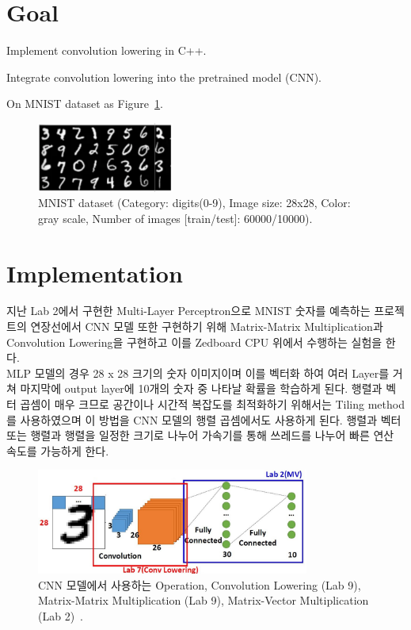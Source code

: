 \documentclass{article}
\begin{document}
\pagestyle{fancy}

\section*{Goal}

\begin{itemize*}
\item Implement convolution lowering in C++.
\item Integrate convolution lowering into the pretrained model (CNN).
\begin{itemize*}
\item On MNIST dataset as Figure~\ref{fig1}.
\end{itemize*}
\end{itemize*}
\begin{figure}[ht]
	\centering
	\includegraphics[width=0.4\textwidth]{fig/mnist.png}
\caption{MNIST dataset (Category: digits(0-9), Image size: 28x28, Color: gray scale, Number of images [train/test]: 60000/10000).}
\label{fig1}
\end{figure}

\section{Implementation}
지난 Lab 2에서 구현한 Multi-Layer Perceptron으로 MNIST 숫자를 예측하는 프로젝트의 연장선에서 CNN 모델 또한 구현하기 위해 Matrix-Matrix Multiplication과 Convolution Lowering을 구현하고 이를 Zedboard CPU 위에서 수행하는 실험을 한다. \\

MLP 모델의 경우 28 x 28 크기의 숫자 이미지이며 이를 벡터화 하여 여러 Layer를 거쳐 마지막에 output layer에 10개의 숫자 중 나타날 확률을 학습하게 된다. 행렬과 벡터 곱셈이 매우 크므로 공간이나 시간적 복잡도를 최적화하기 위해서는 Tiling method를 사용하였으며 이 방법을 CNN 모델의 행렬 곱셈에서도 사용하게 된다. 행렬과 벡터 또는 행렬과 행렬을 일정한 크기로 나누어 가속기를 통해 쓰레드를 나누어 빠른 연산 속도를 가능하게 한다. \\

\begin{figure}[htb!]
	\centering
	\includegraphics[width=0.8\textwidth]{fig/overview.jpg}
\caption{CNN 모델에서 사용하는 Operation, Convolution Lowering (Lab 9), Matrix-Matrix Multiplication (Lab 9), Matrix-Vector Multiplication (Lab 2)~\cite{lab2, lab9}.}
\label{fig2}
\end{figure}
\end{document}
